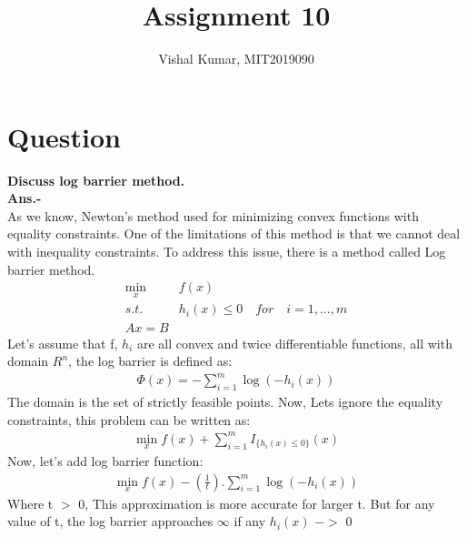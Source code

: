 \documentclass[fleqn]{article}
\title{Assignment 10}
\author{Vishal Kumar, MIT2019090}
\date{}
\begin{document}
\maketitle
\section*{Question}
{\bf Discuss log barrier method.}
\\
{\bf Ans.-}
\\

As we know, Newton’s method used for minimizing convex functions with equality constraints. One of the limitations of this method is that we cannot deal with inequality constraints. To address this issue, there is a method called Log barrier method.
\begin{align*}
\min_{x}\quad& f(x)\\
s.t. \quad& h_{i}(x) \le 0\quad for\quad i = 1,...,m
\\
Ax = B
\end{align*}
Let's assume that f, $h_i$ are all convex and twice differentiable functions, all with domain $R^n$, the log barrier is defined as:
\begin{align*}
\Phi(x) = - \sum_{i = 1}^{m}\log(-h_i(x))
\end{align*}
The domain is the set of strictly feasible points. Now, Lets ignore the equality constraints, this problem can be written as:
\begin{align*}
\min_{x} f(x) + \sum_{i=1}^{m}I_{\{h_{i}(x) \le 0\}}(x)
\end{align*}
Now, let's add log barrier function:
\begin{align*}
\min_{x} f(x) - (\frac{1}{t}). \sum_{i = 1}^{m}\log(-h_i(x))
\end{align*}
Where t $>$ 0, This approximation is more accurate for larger t. But for any value of t, the log barrier approaches $\infty$ if any $h_i(x)$ $->$ 0
\end{document}
